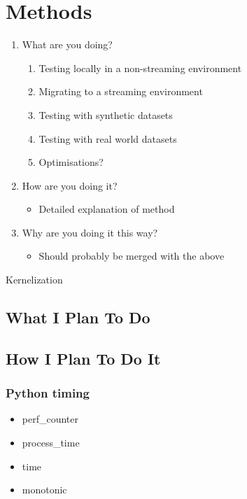 \section{Methods}

\begin{enumerate}
    \item What are you doing?
          \begin{enumerate}
              \item Testing locally in a non-streaming environment
              \item Migrating to a streaming environment
              \item Testing with synthetic datasets
              \item Testing with real world datasets
              \item Optimisations?
          \end{enumerate}
    \item How are you doing it?
          \begin{itemize}
              \item Detailed explanation of method
          \end{itemize}
    \item Why are you doing it this way?
          \begin{itemize}
              \item Should probably be merged with the above
          \end{itemize}
\end{enumerate}

\begin{algorithm}[H]
    \DontPrintSemicolon

\caption{Kernelization}
\end{algorithm}

\subsection{What I Plan To Do}

\subsection{How I Plan To Do It}

\subsubsection{Python timing}

\begin{itemize}
    \item perf\_counter
    \item process\_time
    \item time
    \item monotonic
\end{itemize}
